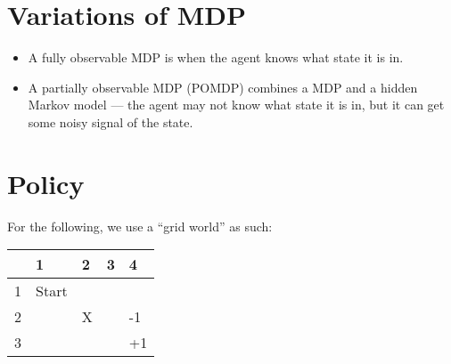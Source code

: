 \documentclass{article}
\begin{document}
\section{Variations of MDP}
\begin{itemize}
    \item A fully observable MDP is when the agent knows what state it is in.
    \item A partially observable MDP (POMDP) combines a MDP and a hidden Markov model --- the agent may not know what state it is in, but it can get some noisy signal of the state.
\end{itemize}

\section{Policy}
For the following, we use a ``grid world'' as such:
\begin{table}[h]
    \centering
    \begin{tabular}{|l|l|l|l|l|}
        \hline
          & 1     & 2 & 3 & 4  \\ \hline
        1 & Start &   &   &    \\ \hline
        2 &       & X &   & -1 \\ \hline
    3 &       &   &   & +1 \\ \hline
    \end{tabular}
\end{table}
\end{document}
